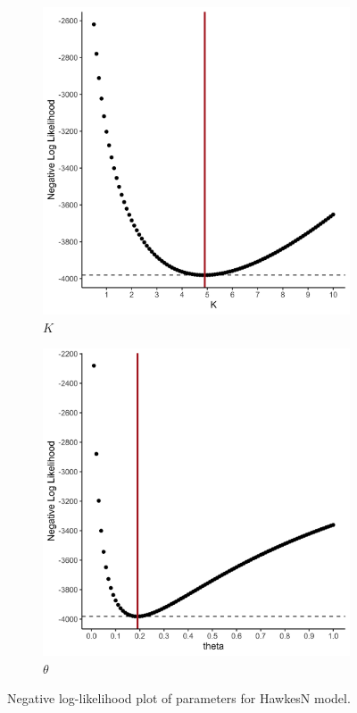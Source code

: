 \documentclass[12pt]{article}
\begin{document}
\begin{figure}
\centering
\begin{subfigure}{.5\textwidth}
  \centering
  \includegraphics[width=0.9\linewidth]{../figures/HawkesN_neg-log-likelihood-plot_K.png}
  \caption{$K$}
\end{subfigure}%
\begin{subfigure}{.5\textwidth}
  \centering
  \includegraphics[width=0.9\linewidth]{../figures/HawkesN_neg-log-likelihood-plot_theta.png}
  \caption{$\theta$}
\end{subfigure}
\caption{Negative log-likelihood plot of parameters for HawkesN model. }
\label{fig:HawkesN-ll}
\end{figure}
\end{document}

